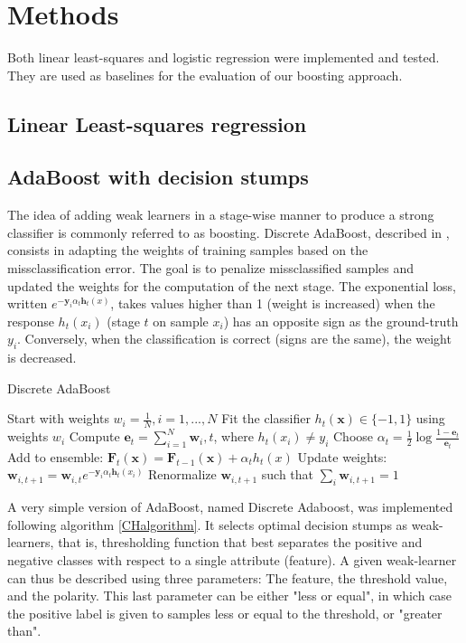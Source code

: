 \documentclass[10pt,conference,compsocconf]{IEEEtran}
\begin{document}
\section{Methods}
\label{sec:orgheadline10}
Both linear least-squares and logistic regression were implemented and tested. They are used as baselines for the evaluation of our boosting approach.
\subsection{Linear Least-squares regression}
\label{sec:orgheadline8}

\subsection{AdaBoost with decision stumps}
\label{sec:orgheadline9}
The idea of adding weak learners in a stage-wise manner to produce a strong classifier is commonly referred to as boosting. Discrete AdaBoost, described in \cite{friedman98}, consists in adapting the weights of training samples based on the missclassification error. The goal is to penalize missclassified samples and updated the weights for the computation of the next stage.
The exponential loss, written \(e^{-\bm{y}_i \alpha_t \bm{h}_t(x)}\), takes values higher than 1 (weight is increased) when the response \(h_t(x_i)\) (stage \(t\) on sample \(x_i\)) has an opposite sign as the ground-truth \(y_i\). Conversely, when the classification is correct (signs are the same), the weight is decreased.

\begin{algorithm}
\caption{Discrete AdaBoost}
\label{CHalgorithm}
\begin{algorithmic}[1]
\State Start with weights $w_i = \frac{1}{N}, i=1,...,N$
\State Fit the classifier $h_t(\bm{x}) \in \{-1,1\}$ using weights $w_i$
\State Compute $\bm{e}_t = \sum_{i=1}^N{\bm{w}_i,t}$, where $h_t(x_i) \neq y_i$
\State Choose $\alpha_t = \frac{1}{2} \log{\frac{1-\bm{e}_t}{\bm{e}_t}}$
\State Add to ensemble: $\bm{F}_t(\bm{x}) = \bm{F}_{t-1}(\bm{x}) + \alpha_t h_t(x)$ 
\State Update weights: $\bm{w}_{i,t+1} = \bm{w}_{i,t} e^{-\bm{y}_i \alpha_t \bm{h}_t(x_i)}$ 
\State Renormalize $\bm{w}_{i,t+1}$ such that $\sum_i{\bm{w}_{i,t+1}} = 1$
\EndFor
\EndProcedure
\end{algorithmic}
\end{algorithm}

A very simple version of AdaBoost, named Discrete Adaboost, was implemented following algorithm \ref{CHalgorithm}. It selects optimal decision stumps as weak-learners, that is, thresholding function that best separates the positive and negative classes with respect to a single attribute (feature). A given weak-learner can thus be described using three parameters: The feature, the threshold value, and the polarity. This last parameter can be either "less or equal", in which case the positive label is given to samples less or equal to the threshold, or "greater than".
\end{document}
